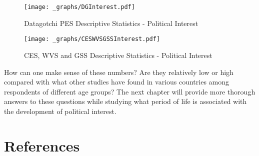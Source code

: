 \documentclass[
  letterpaper,
  DIV=11,
  numbers=noendperiod]{scrreprt}
\begin{document}
\begin{figure}

{\centering \texttt{[image: \_graphs/DGInterest.pdf]}

}

\caption{\label{fig-dginterest}Datagotchi PES Descriptive Statistics -
Political Interest}

\end{figure}

\begin{figure}

{\centering \texttt{[image: \_graphs/CESWVSGSSInterest.pdf]}

}

\caption{\label{fig-ceswvsgssinterest}CES, WVS and GSS Descriptive
Statistics - Political Interest}

\end{figure}

How can one make sense of these numbers? Are they relatively low or high
compared with what other studies have found in various countries among
respondents of different age groups? The next chapter will provide more
thorough answers to these questions while studying what period of life
is associated with the development of political interest.

\hypertarget{references-1}{%
\section{References}\label{references-1}}
\end{document}
